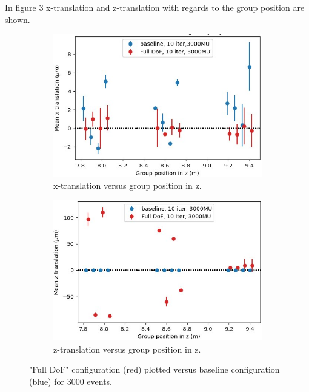 In figure \ref{fig:june_4} x-translation and z-translation with regards to the group position are shown.

\begin{figure}
  \centering
  \begin{subfigure}[b]{0.7\textwidth}
    \centering
    \includegraphics[width=\textwidth]{plots/renewed_plots/lxplus/4_7_a.jpeg}
    \caption{x-translation versus group position in z.}
    \label{fig:june_4_1}
  \end{subfigure}
  \hfill
  \begin{subfigure}[b]{0.7\textwidth}
    \centering
    \includegraphics[width=\textwidth]{plots/renewed_plots/lxplus/4_7_b.jpeg}
    \caption{z-translation versus group position in z.}
    \label{fig:june_4_2}
  \end{subfigure}
  \caption{"Full DoF" configuration (red) plotted versus baseline configuration (blue) for 3000 events.}
  \label{fig:june_4}
\end{figure}

